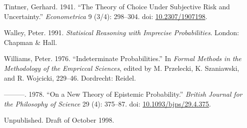 \documentclass[
  11pt,
  letterpaper,
  DIV=11,
  numbers=noendperiod,
  twoside]{scrartcl}
\newlength{\cslhangindent}
\newenvironment{CSLReferences}[2] %
 {\begin{list}{}{%
  \setlength{\itemindent}{0pt}
  \setlength{\leftmargin}{0pt}
  \setlength{\parsep}{0pt}
  \ifodd #1
   \setlength{\leftmargin}{\cslhangindent}
   \setlength{\itemindent}{-1\cslhangindent}
  \fi
  \setlength{\itemsep}{#2\baselineskip}}}
 {\end{list}}
\begin{document}
\begin{CSLReferences}{1}{0}
Tintner, Gerhard. 1941. {``The Theory of Choice Under Subjective Risk
and Uncertainty.''} \emph{Econometrica} 9 (3/4): 298--304. doi:
\href{https://doi.org/10.2307/1907198}{10.2307/1907198}.

Walley, Peter. 1991. \emph{Statisical Reasoning with Imprecise
Probabilities}. London: Chapman \& Hall.

Williams, Peter. 1976. {``Indeterminate Probabilities.''} In
\emph{Formal Methods in the Methodology of the Empriccal Sciences},
edited by M. Przelecki, K. Szaniawski, and R. Wojcicki, 229--46.
Dordrecht: Reidel.

---------. 1978. {``On a New Theory of Epistemic Probability.''}
\emph{British Journal for the Philosophy of Science} 29 (4): 375--87.
doi:
\href{https://doi.org/10.1093/bjps/29.4.375}{10.1093/bjps/29.4.375}.

\end{CSLReferences}



\noindent Unpublished. Draft of October 1998.
\end{document}
